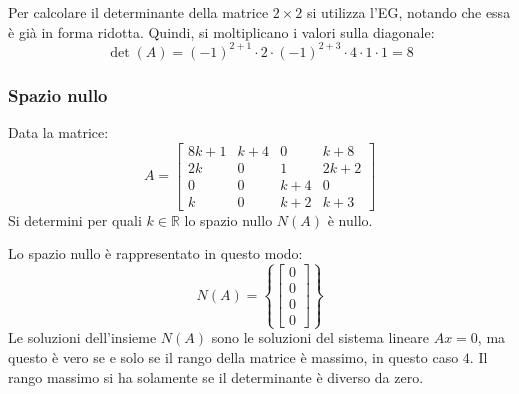 \documentclass[a4paper]{article}
\begin{document}
	Per calcolare il determinante della matrice $2 \times 2$ si utilizza l'EG, notando che essa è già in forma ridotta. Quindi, si moltiplicano i valori sulla diagonale:
	\begin{equation*}
		\det\left(A\right) = \left(-1\right)^{2+1} \cdot 2 \cdot \left(-1\right)^{2+3} \cdot 4 \cdot 1 \cdot 1 = 8
	\end{equation*}\newpage

	\subsubsection{Spazio nullo}\label{Spazio nullo}
	
	Data la matrice:
	\begin{equation*}
		A = \begin{bmatrix}
			8k+1	& k+4	& 0		& k+8 	\\
			2k 		& 0 	& 1 	& 2k+2 	\\
			0		& 0 	& k+4 	& 0 	\\
			k		& 0 	& k+2 	& k+3
		\end{bmatrix}
	\end{equation*}
	Si determini per quali $k \in \mathbb{R}$ lo spazio nullo $N\left(A\right)$ è nullo.\newline
	
	\noindent
	Lo spazio nullo è rappresentato in questo modo:
	\begin{equation*}
		N\left(A\right) = \left\{\begin{bmatrix}
			0 \\
			0 \\
			0 \\
			0
		\end{bmatrix}\right\}
	\end{equation*}
	Le soluzioni dell'insieme $N\left(A\right)$ sono le soluzioni del sistema lineare $Ax = 0$, ma questo è vero se e solo se il rango della matrice è massimo, in questo caso $4$. Il rango massimo si ha solamente se il determinante è diverso da zero.\newline
	
\end{document}
